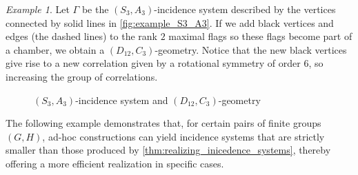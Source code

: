 \documentclass{amsart}
\theoremstyle{definition}
\theoremstyle{remark}
\newtheorem{example}[theorem]{Example}
\begin{document}
\begin{example}\label{ex:completing_just_flags_is_not_enough}
Let $\Gamma$ be the $(S_3,A_3)$-incidence system described by the vertices connected by solid lines in \autoref{fig:example_S3_A3}. If we add black vertices and edges (the dashed lines) to the rank $2$ maximal flags so these flags become part of a chamber, we obtain a $(D_{12},C_3)$-geometry. Notice that the new black vertices give rise to a new correlation given by a rotational symmetry of order $6$, so increasing the group of correlations.

\begin{figure}[ht]
\centering

\caption{$(S_3,A_3)$-incidence system and $(D_{12},C_3)$-geometry}
\label{fig:example_S3_A3}
\end{figure}

\end{example}

The following example demonstrates that, for certain pairs of finite groups $(G,H)$, ad-hoc constructions can yield incidence systems that are strictly smaller than those produced by \autoref{thm:realizing_inicedence_systems}, thereby offering a more efficient realization in specific cases.
\end{document}
